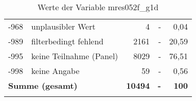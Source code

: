 \begin{longtable}{Xlrrr}
       -968 & unplausibler Wert & 4 & - & 0,04 \\

       -989 & filterbedingt fehlend & 2161 & - & 20,59 \\

       -995 & keine Teilnahme (Panel) & 8029 & - & 76,51 \\

       -998 & keine Angabe & 59 & - & 0,56 \\

     \midrule
     \multicolumn{2}{l}{\textbf{Summe (gesamt)}} & \textbf{10494} & \textbf{-} & \textbf{100} \\
     \bottomrule
     \caption{Werte der Variable mres052f\_g1d}
     \end{longtable}
     
